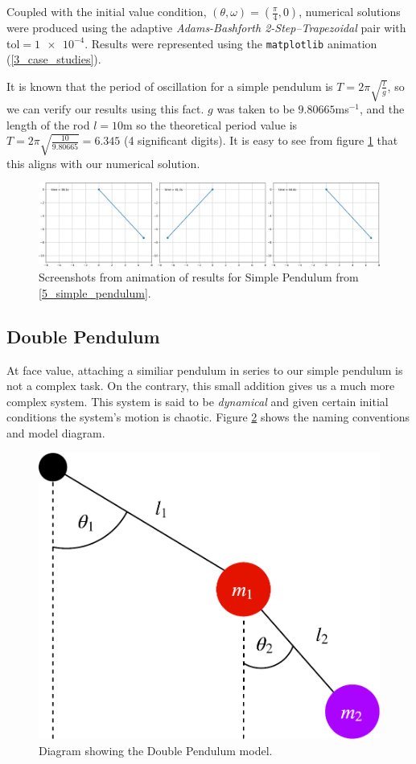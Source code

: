 \documentclass[12pt, twoside]{report}
\theoremstyle{plain}
\theoremstyle{definition}
\theoremstyle{definition}
\begin{document}
            Coupled with the initial value condition, $(\theta, \omega)
            =(\frac{\pi}{4}, 0)$, numerical solutions were produced using the
            adaptive \textit{Adams-Bashforth 2-Step--Trapezoidal} pair with
            tol$=\num{1e-4}$. Results were represented using the 
            \texttt{matplotlib} animation (\ref{3_case_studies}).
            
            It is known that the period of oscillation for a simple pendulum
            is $T = 2\pi \sqrt{\frac{l}{g}}$, so we can verify our results
            using this fact. $g$ was taken to be $9.80665$ms$^{-1}$, and the 
            length of the rod $l=10$m so the theoretical period value is 
            $T = 2\pi \sqrt{\frac{10}{9.80665}} = 6.345$ (4 significant
            digits). It is easy to see from figure \ref{5_simple_animations} 
            that this aligns with our numerical solution.

            \begin{figure}[H]
                \centering
                    \includegraphics[width=\columnwidth]{1_shm}
                    \caption{Screenshots from animation of results for Simple
                    Pendulum from \ref{5_simple_pendulum}.}
                    \label{5_simple_animations}
            \end{figure}

        \subsection{Double Pendulum}
        \label{5_double_pendulum}
            At face value, attaching a similiar pendulum in series to our
            simple pendulum is not a complex task. On the contrary, this 
            small addition gives us a much more complex system. This system is
            said to be \textit{dynamical} and given certain initial conditions 
            the system's motion is chaotic. Figure \ref{5_double_diag}
            shows the naming conventions and model diagram.

            \begin{figure}[H]
                \centering
                    \includegraphics[width=0.3\columnwidth]{double_pendulum}
                    \caption{Diagram showing the Double Pendulum model.}
                    \label{5_double_diag}
            \end{figure}
\end{document}
